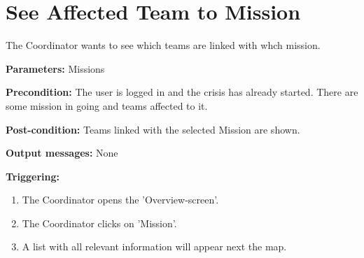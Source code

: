 \section{See Affected Team to Mission}
\label{operation:TeamToMission}
The Coordinator wants to see which teams are linked with whch mission.
\begin{description}
\item \textbf{Parameters:} Missions
\item \textbf{Precondition:} The user is logged in and the
crisis has already started. There are some mission in going and teams affected
to it.
\item \textbf{Post-condition:} Teams linked with the selected Mission are
shown.
\item \textbf{Output messages:} None
\item \textbf{Triggering:}
\begin{enumerate}
\item The Coordinator opens the 'Overview-screen'.
\item The Coordinator clicks on 'Mission'.
\item A list with all relevant information will appear next the map.
\end{enumerate}
\end{description}  





